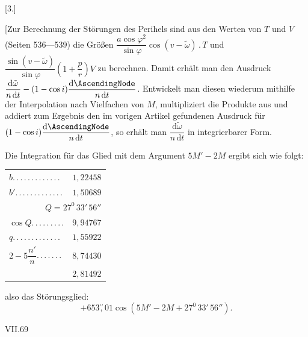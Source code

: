 \begin{landscape}
\begingroup
\fontsize{10}{13}\selectfont
{}
\renewcommand{\headrulewidth}{0pt}
\par\medskip
{}
\begin{center}[3.]\end{center}
\par\noindent\hspace*{\parindent}[Zur Berechnung der Störungen des Perihels sind aus den Werten von \(T\) und \(V\) (Seiten 536---539) die Größen \(\dfrac{a\cos\varphi^2}{\sin\varphi}\cos(v-\tilde\omega)\mathbin{.}T\) und \(\dfrac{\sin(v-\tilde\omega)}{\sin\varphi}\left(1+\dfrac{p}{r}\right)V\) zu berechnen. Damit erhält man den Ausdruck \(\dfrac{\mathrm{d}\tilde\omega}{n\,\mathrm{d}t}-(1-\cos i)\dfrac{\mathrm{d}\AscendingNode}{n\,\mathrm{d}t}\). Entwickelt man diesen wiederum mithilfe der Interpolation nach Vielfachen von \(M\), multipliziert die Produkte aus und addiert zum Ergebnis den im vorigen Artikel gefundenen Ausdruck für \((1-\cos i)\dfrac{\mathrm{d}\AscendingNode}{n\,\mathrm{d}t}\), so erhält man \(\dfrac{\mathrm{d}\tilde\omega}{n\,\mathrm{d}t}\) in integrierbarer Form.
\par\noindent\hspace*{\parindent}Die Integration für das Glied mit dem Argument \(5M'-2M\) ergibt sich wie folgt:
\par
\begingroup\small
\noindent\begin{minipage}[c]{.43\textwidth}
\begin{tabular}{@{}lr@{}}
\(b\)\enspace .\,.\,.\,.\,.\,.\,.\,.\,.\,.\,.\,.\,.&\(1{,}22458\)\\
\(b'\)\enspace .\,.\,.\,.\,.\,.\,.\,.\,.\,.\,.\,.\,.&\(1{,}50689\)\\
\multicolumn{2}{r}{\(Q=27^0\,33'\,56''\)}\\
\(\cos Q\)\enspace .\,.\,.\,.\,.\,.\,.\,.\,.&\(9{,}94767\)\\
\(q\)\enspace .\,.\,.\,.\,.\,.\,.\,.\,.\,.\,.\,.\,.&\(1{,}55922\)\\
\(2-5\dfrac{n'}{n}\)\enspace .\,.\,.\,.\,.\,.\,.&\(8{,}74430\)\\
\hline
&\(2{,}81492\)
\end{tabular}
\end{minipage}\hfill
\begin{minipage}[c]{.55\textwidth}
also das Störungsglied:
\[
+653\overset{\prime\prime}{,}01\cos(5M'-2M+27^0\,33'\,56'').
\]
\end{minipage}\par
\endgroup
\noindent VII.\hfill 69\par
\clearpage
\endgroup
\end{landscape}
